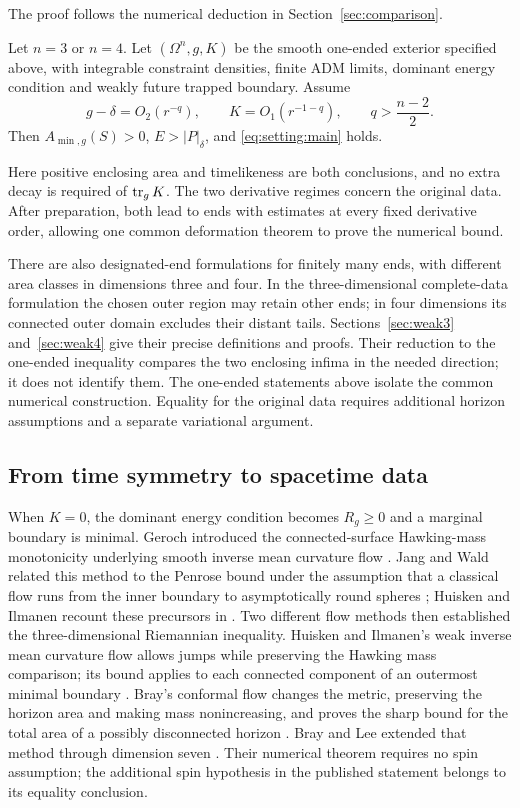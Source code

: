 The proof follows the numerical deduction in Section~\ref{sec:comparison}.

\begin{theorem}\label{thm:low}
Let $n=3$ or $n=4$. Let $(\Omega^n,g,K)$ be the smooth one-ended
exterior specified above, with integrable constraint densities, finite
ADM limits, dominant energy condition and weakly future trapped
boundary. Assume
\[
 g-\delta=O_2(r^{-q}),\qquad K=O_1(r^{-1-q}),\qquad q>\frac{n-2}{2}.
\]
Then $A_{\min,g}(S)>0$, $E>|P|_\delta$, and \eqref{eq:setting:main} holds.
\end{theorem}

Here positive enclosing area and timelikeness are both conclusions, and
no extra decay is required of $\operatorname{tr}_gK$. The two derivative regimes concern
the original data. After preparation, both lead to ends with estimates at every fixed derivative
order, allowing one common deformation theorem to prove the numerical
bound.

There are also designated-end formulations for finitely many ends,
with different area classes in dimensions three and four. In the
three-dimensional complete-data formulation the chosen outer region
may retain other ends; in four dimensions its connected outer domain
excludes their distant tails. Sections~\ref{sec:weak3} and~\ref{sec:weak4} give their
precise definitions and proofs. Their reduction to the one-ended inequality compares
the two enclosing infima in the needed direction; it does not identify
them. The one-ended statements above isolate the common numerical
construction. Equality for the original data requires additional
horizon assumptions and a separate variational argument.

\subsection{From time symmetry to spacetime data}
When $K=0$, the dominant energy condition becomes $R_g\geq0$ and a
marginal boundary is minimal. Geroch introduced the connected-surface
Hawking-mass monotonicity underlying smooth inverse mean curvature flow
\cite{Geroch1973}. Jang and Wald related this method to the Penrose
bound under the assumption that a classical flow runs from the inner
boundary to asymptotically round spheres \cite{JangWald1977};
Huisken and Ilmanen recount these precursors in
\cite[p.~359]{HuiskenIlmanen2001}. Two different flow methods then
established the three-dimensional Riemannian inequality. Huisken and Ilmanen's weak
inverse mean curvature flow allows jumps while preserving the Hawking
mass comparison; its bound applies to each connected component of an
outermost minimal boundary \cite{HuiskenIlmanen2001}. Bray's conformal flow changes
the metric, preserving the horizon area and making mass nonincreasing, and proves
the sharp bound for the total area of a possibly disconnected horizon
\cite{Bray2001}. Bray and Lee extended that method through dimension seven
\cite{BrayLee2009}. Their numerical theorem requires no spin assumption;
the additional spin hypothesis in the published statement belongs to
its equality conclusion.


